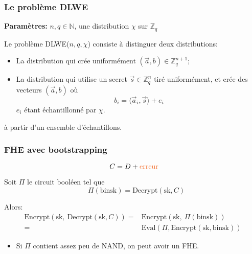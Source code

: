 \documentclass[10pt,xcolor={usenames,dvipsnames}]{beamer}
\newcommand{\ZZq}{\mathbb{Z}_q}
\begin{document}
\begin{frame} 
\frametitle{Le problème DLWE}
\textbf{Paramètres:} $n, q\in \mathbb{N}$, une distribution $\chi$ sur $\ZZq$

Le problème DLWE($n,q,\chi$) consiste à distinguer deux distributions:
\begin{itemize}
\item La distribution qui crée uniformément $(\vec{a}, b) \in \ZZq^{n+1}$;
\item La distribution qui utilise un secret $\vec{s}\in \ZZq^n$ tiré uniformément, 
et crée des vecteurs $(\vec{a}, b)$ où
\[ b_i = \langle \vec{a}_i, \vec{s} \rangle + e_i \] 
$e_i$ étant échantillonné par $\chi$.
\end{itemize}
à partir d'un ensemble d'échantillons.
\end{frame} 


\begin{frame} 
\frametitle{FHE avec bootstrapping}
\[ C = D + \text{\textcolor{Orange}{erreur}} \]
  \noindent
  \begin{center}
      \begin{tikzpicture}[scale = 1, transform shape]
      	
      \end{tikzpicture}
  \end{center}
  \noindent
  \vspace{-0.7cm}


\pause
Soit $\Pi$ le circuit booléen tel que 
\[\quad\Pi(\text{binsk})= \text{Decrypt}\left(\text{sk}, C\right) \]

\pause
Alors:
\begin{align*}
\text{Encrypt}\left(\text{sk},\: \text{Decrypt}\left(\text{sk},C\right)\right) 
=& \text{Encrypt}\left(\text{sk},\: \Pi(\text{binsk})\right) \\
=& \text{Eval}\left(\Pi, \text{Encrypt}(\text{sk}, \text{binsk})\right)
\end{align*}
\vspace{-0.5cm}
\begin{itemize}
\item Si $\Pi$ contient assez peu de NAND, on peut avoir un FHE.
\end{itemize}

\end{frame} 
\end{document}
